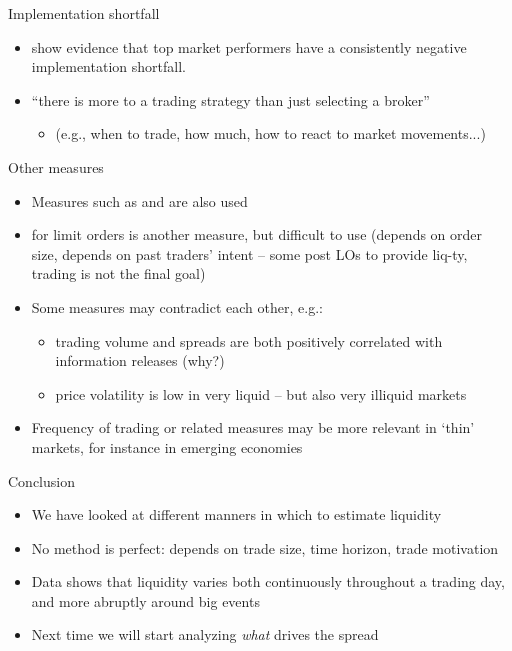 \documentclass[english,10pt
,aspectratio=169
]{beamer}
\begin{document}
	
\begin{frame}{Implementation shortfall}
	\begin{itemize}
		\item \citet{anand_performance_2012} show evidence that top market performers have a consistently negative implementation shortfall.
		\item ``there is more to a trading strategy than just selecting a broker''
		\begin{itemize}
			\item (e.g., when to trade, how much, how to react to market movements...)
		\end{itemize}
	\end{itemize}
\end{frame}


\begin{frame}{Other measures}
\begin{itemize}
	\item Measures such as  and  are also used
	\item {} for limit orders is another measure, but difficult to use (depends on order size, depends on past traders' intent -- some post LOs to provide liq-ty, trading is not the final goal)
	\\[4ex]
	\item Some measures may contradict each other, e.g.:
	\begin{itemize}
		\item trading volume and spreads are both positively correlated with information releases (why?)
		\item price volatility is low in very liquid -- but also very illiquid markets
	\end{itemize}
	\item Frequency of trading or related measures may be more relevant in `thin' markets, for instance in emerging economies
\end{itemize}
\end{frame}


\begin{frame}{Conclusion}
	\begin{itemize}
		\item We have looked at different manners in which to estimate liquidity
		\item No method is perfect: depends on trade size, time horizon, trade motivation
		\item Data shows that liquidity varies both continuously throughout a trading day, and more abruptly around big events
		\item Next time we will start analyzing \textit{what} drives the spread
	\end{itemize}
\end{frame}
\end{document}
